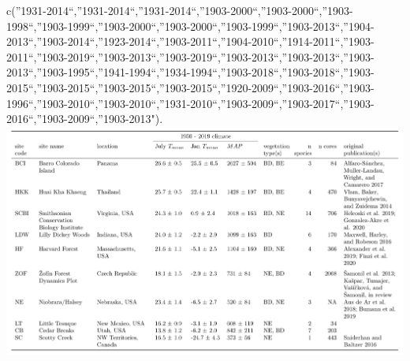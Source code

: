 \documentclass[
]{article}
\begin{document}
c(''1931-2014``,''1931-2014``,''1931-2014``,''1903-2000``,''1903-2000``,''1903-1998``,''1903-1999``,''1903-2000``,''1903-2000``,''1903-1999``,''1903-2013``,''1904-2013``,''1903-2014``,''1923-2014``,''1903-2011``,''1904-2010``,''1914-2011``,''1903-2011``,''1903-2019``,''1903-2013``,''1903-2019``,''1903-2013``,''1903-2013``,''1903-2013``,''1903-1995``,''1941-1994``,''1934-1994``,''1903-2018``,''1903-2018``,''1903-2015``,''1903-2015``,''1903-2015``,''1903-2015``,''1920-2009``,''1903-2016``,''1903-1996``,''1903-2010``,''1903-2010``,''1931-2010``,''1903-2009``,''1903-2017``,''1903-2016``,''1903-2009``,''1903-2013").
\includegraphics{tables_figures/sites_table.png}
\end{document}
